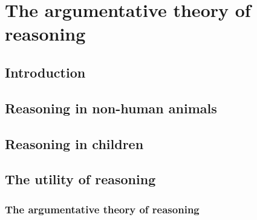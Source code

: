 \chapter{The argumentative theory of reasoning}
\label{ch:reasoning}

\section*{Introduction}

\section{Reasoning in non-human animals}

\section{Reasoning in children}

\section{The utility of reasoning}

\subsection{The argumentative theory of reasoning}
